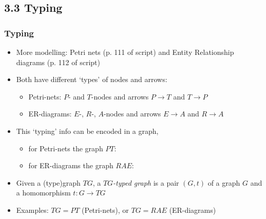 \documentclass[handout]{beamer}
\begin{document}
\subsection{3.3 Typing}


\frame
  {   
    \frametitle{Typing}\label{Ch3:Typing}

 \begin{itemize}[<+->]
\item More modelling: Petri nets (p. 111 of script) and 
Entity Relationship diagrams (p. 112 of script)
\item Both have different `types' of nodes and arrows: 
 \begin{itemize}
\item Petri-nets: $P$- and $T$-nodes and arrows $P\to T$ and $T\to P$
\item ER-diagrams: $E$-, $R$-, $A$-nodes and arrows $E\to A$ and $R\to A$ 
 \end{itemize}
\item This `typing' info can be encoded in a graph,
 \begin{itemize}
\item for Petri-nets the graph $PT$:
\item for ER-diagrams the graph $RAE$:
 \end{itemize}
\item Given a (type)graph $TG$,  a \emph{$TG$-typed graph} is a pair $(G,t)$ of a graph $G$ and a
homomorphism $t : G \to TG$ 
\item Examples: $TG{=}PT$ (Petri-nets), or $TG{=}RAE$ (ER-diagrams)
 \end{itemize}

 }
\end{document}
